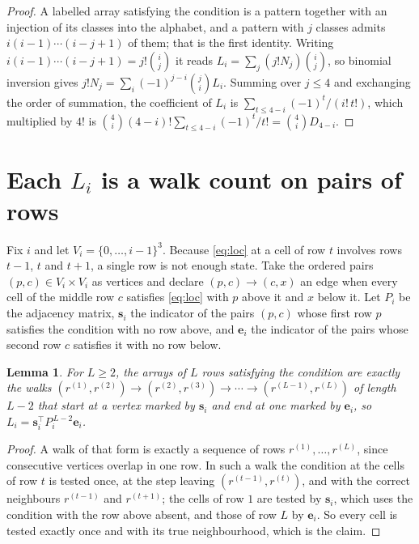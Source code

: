 \documentclass[11pt,a4paper]{article}
\theoremstyle{plain}
\newtheorem{lemma}[theorem]{Lemma}
\theoremstyle{definition}
\begin{document}
\begin{proof}
A labelled array satisfying the condition is a pattern together with an injection of its
classes into the alphabet, and a pattern with $j$ classes admits $i(i-1)\cdots(i-j+1)$ of
them; that is the first identity. Writing $i(i-1)\cdots(i-j+1)=j!\binom{i}{j}$ it reads
$L_i=\sum_j(j!N_j)\binom{i}{j}$, so binomial inversion gives
$j!N_j=\sum_i(-1)^{j-i}\binom{j}{i}L_i$. Summing over $j\le4$ and exchanging the
order of summation, the coefficient of $L_i$ is
$\sum_{t\le4-i}(-1)^t/(i!\,t!)$, which multiplied by $4!$ is
$\binom{4}{i}(4-i)!\sum_{t\le4-i}(-1)^t/t!=\binom{4}{i}D_{4-i}$.
\end{proof}

\section{Each $L_i$ is a walk count on pairs of rows}

Fix $i$ and let $V_i=\{0,\dots,i-1\}^{3}$. Because \eqref{eq:loc} at a cell of row
$t$ involves rows $t-1$, $t$ and $t+1$, a single row is not enough state. Take the
ordered pairs $(p,c)\in V_i\times V_i$ as vertices and declare $(p,c)\to(c,x)$ an edge when
every cell of the middle row $c$ satisfies \eqref{eq:loc} with $p$ above it and $x$
below it. Let $P_i$ be the adjacency matrix, $\mathbf{s}_i$ the indicator of the pairs
$(p,c)$ whose first row $p$ satisfies the condition with no row above, and
$\mathbf{e}_i$ the indicator of the pairs whose second row $c$ satisfies it with no
row below.

\begin{lemma}\label{lem:walk}
For $L\ge2$, the arrays of $L$ rows satisfying the condition are exactly the walks
$(r^{(1)},r^{(2)})\to(r^{(2)},r^{(3)})\to\cdots\to(r^{(L-1)},r^{(L)})$ of length
$L-2$ that start at a vertex marked by $\mathbf{s}_i$ and end at one marked by
$\mathbf{e}_i$, so
$L_i=\mathbf{s}_i^{\!\top}P_i^{\,L-2}\mathbf{e}_i$.
\end{lemma}

\begin{proof}
A walk of that form is exactly a sequence of rows $r^{(1)},\dots,r^{(L)}$, since
consecutive vertices overlap in one row. In such a walk the condition at the cells of
row $t$ is tested once, at the step leaving $(r^{(t-1)},r^{(t)})$, and with the
correct neighbours $r^{(t-1)}$ and $r^{(t+1)}$; the cells of row $1$ are tested by
$\mathbf{s}_i$, which uses the condition with the row above absent, and those of row
$L$ by $\mathbf{e}_i$. So every cell is tested exactly once and with its true
neighbourhood, which is the claim.
\end{proof}
\end{document}
